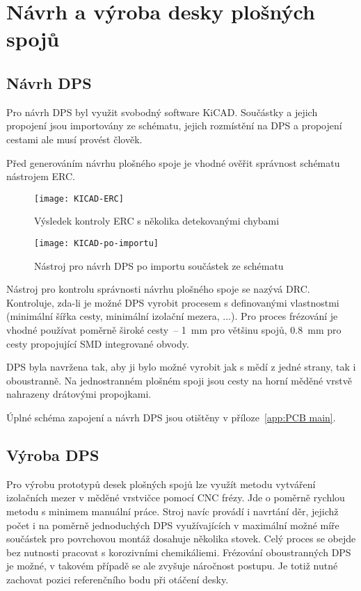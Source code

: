 \section{Návrh a výroba desky plošných spojů}
\subsection{Návrh DPS}
Pro návrh DPS byl využit svobodný software KiCAD. Součástky a jejich propojení
jsou importovány ze schématu, jejich rozmístění na DPS a propojení cestami ale
musí provést člověk.

Před generováním návrhu plošného spoje je vhodné ověřit správnost schématu
nástrojem \ac{ERC}.

\begin{figure}[htbp]
    \centering
    \texttt{[image: KICAD-ERC]}
    \caption{Výsledek kontroly \acs{ERC} s několika detekovanými chybami}
    \label{fig:kicad ERC}
\end{figure}

\begin{figure}[htbp]
    \centering
    \texttt{[image: KICAD-po-importu]}
    \caption{%
        Nástroj pro návrh DPS  po importu součástek ze
        schématu
    }
    \label{fig:kicad po importu}
\end{figure}

Nástroj pro kontrolu správnosti návrhu plošného spoje se nazývá \ac{DRC}.
Kontroluje, zda-li je možné DPS vyrobit procesem s definovanými vlastnostmi
(minimální šířka cesty, minimální izolační mezera, ...). Pro proces frézování
je vhodné používat poměrně široké cesty~-- \SI{1}{\milli\meter} pro většinu
spojů, \SI{0,8}{\milli\meter} pro cesty propojující SMD integrované obvody.

DPS byla navržena tak, aby ji bylo možné vyrobit jak s mědí z jedné strany,
tak i oboustranně. Na jednostranném plošném spoji jsou cesty na horní měděné
vrstvě nahrazeny drátovými propojkami.

Úplné schéma zapojení a návrh DPS jsou otištěny v příloze~\vref{app:PCB main}.


\subsection{Výroba DPS}
Pro výrobu prototypů desek plošných spojů lze využít metodu vytváření
izolačních mezer v měděné vrstvičce pomocí CNC frézy. Jde o poměrně rychlou
metodu s minimem manuální práce. Stroj navíc provádí i navrtání děr, jejichž
počet i na poměrně jednoduchých DPS využívajících v maximální možné míře
součástek pro povrchovou montáž dosahuje několika stovek. Celý proces se obejde
bez nutnosti pracovat s korozivními chemikáliemi. Frézování oboustranných DPS
je možné, v takovém případě se ale zvyšuje náročnost postupu. Je totiž nutné
zachovat pozici referenčního bodu při otáčení desky.

